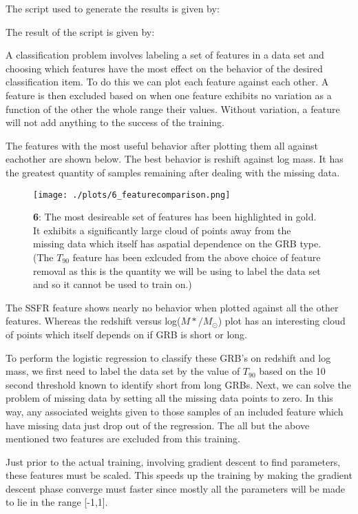 
The script used to generate the results is given by:



The result of the script is given by:





A classification problem involves labeling a set of features in a data set and choosing which features have the most effect on the behavior of the desired classification item. To do this we can plot each feature against each other. A feature is then excluded based on when one feature exhibits no variation as a function of the other the whole range their values. Without variation, a feature will not add anything to the success of the training.

The features with the most useful behavior after plotting them all against eachother are shown below. The best behavior is reshift against log mass. It has the greatest quantity of samples remaining after dealing with the missing data.
\begin{figure}[h!]
  \centering
  \texttt{[image: ./plots/6\_featurecomparison.png]}
  \caption{\textbf{6}: The most desireable set of features has been highlighted in gold. It exhibits a significantly large cloud of points away from the missing data which itself has aspatial dependence on the GRB type. (The $T_{90}$ feature has been exlcuded from the above choice of feature removal as this  is the quantity we will be using to label the data set and so it cannot be used to train on.)}
  \label{fig:featurecomparison}
\end{figure}

The SSFR feature shows nearly no behavior when plotted against all the other features. Whereas the redshift versus log($M*/M_{\odot}$) plot has an interesting cloud of points which itself depends on if GRB is short or long.

To perform the logistic regression to classify these GRB's on redshift and log mass, we first need to label the data set by the value of $T_{90}$ based on the 10 second threshold known to identify short from long GRBs. Next, we can solve the problem of missing data by setting all the missing data points to zero. In this way, any associated weights given to those samples of an included feature which have missing data just drop out of the regression. The all but the above mentioned two features are excluded from this training.

Just prior to the actual training, involving gradient descent to find parameters, these features must be scaled. This speeds up the training by making the gradient descent phase converge must faster since mostly all the parameters will be made to lie in the range [-1,1].

